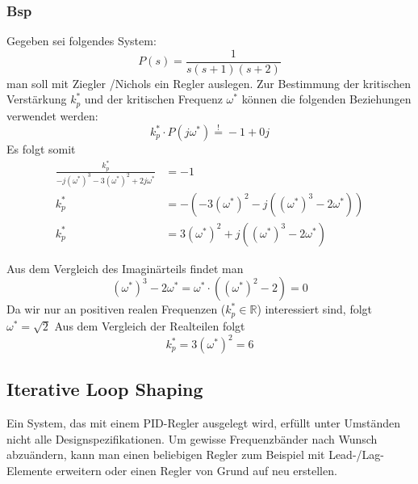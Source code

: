         \subsubsection{Bsp}
            Gegeben sei folgendes System:  
            \[P(s) = \frac{1}{s(s+1)(s+2)}\]
            man soll mit Ziegler /Nichols ein Regler auslegen.
            Zur Bestimmung der kritischen Verstärkung $k_p^*$ und der kritischen Frequenz $\omega^*$ können die folgenden Beziehungen verwendet werden:
            \[k_p^* \cdot P(j\omega^*) \overset{!}{=} -1+0j\]
            Es folgt somit
            \begin{align*}
            \frac{k_p^*}{-j(\omega^*)^3-3(\omega^*)^2+2j\omega^*} &= -1\\
            k_p^* &= -(-3(\omega^*)^2 - j((\omega^*)^3-2\omega^*))\\
            k_p^* &= 3(\omega^*)^2+j((\omega^*)^3-2\omega^*)
            \end{align*}
            
            Aus dem Vergleich des Imaginärteils findet man 
            \[
            (\omega^*)^3-2\omega^* = \omega^* \cdot((\omega^*)^2-2) = 0\]
            Da wir nur an positiven realen Frequenzen ($k_p^* \in \mathbb{R}$) interessiert sind, folgt $\omega^*=\sqrt{2}$ Aus dem Vergleich der Realteilen folgt
            \[
            k_p^* = 3(\omega^*)^2 = 6
            \]
    \subsection{Iterative Loop Shaping}
        Ein System, das mit einem PID-Regler ausgelegt wird, erfüllt unter Umständen nicht alle Designspezifikationen. Um gewisse Frequenzbänder nach Wunsch abzuändern, kann man einen beliebigen Regler zum Beispiel mit Lead-/Lag- Elemente erweitern oder einen Regler von Grund auf neu
        erstellen. 
